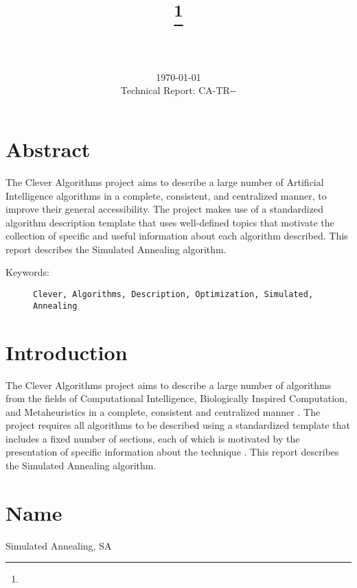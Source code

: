 \documentclass[a4paper, 11pt]{article}
\title{{\myreporttitle}\footnote{\myreportlicense}}
\author{\myreportauthor\\{\myreportemail}\\\small\myreportproject}
\date{\today\\{\small{Technical Report: CA-TR-{\myreportdate}-\myreportversion}}}
\begin{document}
\maketitle

\section*{Abstract} 
The Clever Algorithms project aims to describe a large number of Artificial Intelligence algorithms in a complete, consistent, and centralized manner, to improve their general accessibility. 
The project makes use of a standardized algorithm description template that uses well-defined topics that motivate the collection of specific and useful information about each algorithm described.
This report describes the Simulated Annealing algorithm.

\begin{description}
	\item[Keywords:] {\small\texttt{Clever, Algorithms, Description, Optimization, Simulated, Annealing}}
\end{description} 

\section{Introduction} 
\label{sec:intro}
The Clever Algorithms project aims to describe a large number of algorithms from the fields of Computational Intelligence, Biologically Inspired Computation, and Metaheuristics in a complete, consistent and centralized manner \cite{Brownlee2010}.
The project requires all algorithms to be described using a standardized template that includes a fixed number of sections, each of which is motivated by the presentation of specific information about the technique \cite{Brownlee2010a}.
This report describes the Simulated Annealing algorithm.

\section{Name} 
\label{sec:name}
Simulated Annealing, SA
\end{document}
